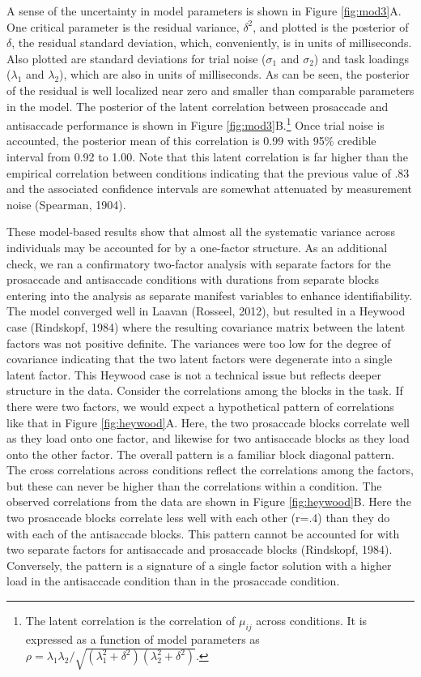 \documentclass[
  ,man,floatsintext]{apa6}
\begin{document}
A sense of the uncertainty in model parameters is shown in Figure \ref{fig:mod3}A. One critical parameter is the residual variance, \(\delta^2\), and plotted is the posterior of \(\delta\), the residual standard deviation, which, conveniently, is in units of milliseconds. Also plotted are standard deviations for trial noise (\(\sigma_1\) and \(\sigma_2\)) and task loadings (\(\lambda_1\) and \(\lambda_2\)), which are also in units of milliseconds. As can be seen, the posterior of the residual is well localized near zero and smaller than comparable parameters in the model. The posterior of the latent correlation between prosaccade and antisaccade performance is shown in Figure \ref{fig:mod3}B.\footnote{The latent correlation is the correlation of \(\mu_{ij}\) across conditions. It is expressed as a function of model parameters as \(\rho=\lambda_1\lambda_2/\sqrt{(\lambda_1^2+\delta^2)(\lambda_2^2+\delta^2)}\).} Once trial noise is accounted, the posterior mean of this correlation is 0.99 with 95\% credible interval from 0.92 to 1.00. Note that this latent correlation is far higher than the empirical correlation between conditions indicating that the previous value of .83 and the associated confidence intervals are somewhat attenuated by measurement noise (Spearman, 1904).

These model-based results show that almost all the systematic variance across individuals may be accounted for by a one-factor structure. As an additional check, we ran a confirmatory two-factor analysis with separate factors for the prosaccade and antisaccade conditions with durations from separate blocks entering into the analysis as separate manifest variables to enhance identifiability. The model converged well in Laavan (Rosseel, 2012), but resulted in a Heywood case (Rindskopf, 1984) where the resulting covariance matrix between the latent factors was not positive definite. The variances were too low for the degree of covariance indicating that the two latent factors were degenerate into a single latent factor. This Heywood case is not a technical issue but reflects deeper structure in the data. Consider the correlations among the blocks in the task. If there were two factors, we would expect a hypothetical pattern of correlations like that in Figure \ref{fig:heywood}A. Here, the two prosaccade blocks correlate well as they load onto one factor, and likewise for two antisaccade blocks as they load onto the other factor. The overall pattern is a familiar block diagonal pattern. The cross correlations across conditions reflect the correlations among the factors, but these can never be higher than the correlations within a condition. The observed correlations from the data are shown in Figure \ref{fig:heywood}B. Here the two prosaccade blocks correlate less well with each other (r=.4) than they do with each of the antisaccade blocks. This pattern cannot be accounted for with two separate factors for antisaccade and prosaccade blocks (Rindskopf, 1984). Conversely, the pattern is a signature of a single factor solution with a higher load in the antisaccade condition than in the prosaccade condition.
\end{document}
